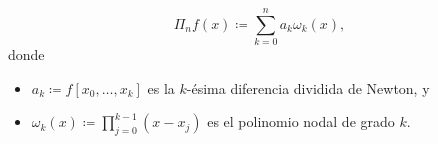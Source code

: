 \begin{frame}



	\begin{definition}
		\begin{equation*}
			\Pi_{n}
			f\left(x\right)\coloneqq
			\sum\limits_{k=0}^{n}
			a_{k}
			\omega_{k}\left(x\right),
		\end{equation*}
		donde
		\begin{itemize}
			\item

			      \begin{math}
				      a_{k}\coloneqq
				      f\left[x_{0},\ldots,x_{k}\right]
			      \end{math}
			      es la $k$-ésima diferencia dividida de Newton, y

			\item

			      \begin{math}
				      \omega_{k}
				      \left(x\right)\coloneqq
				      \prod\limits_{j=0}^{k-1}
				      \left(x-x_{j}\right)
			      \end{math}
			      es el polinomio nodal de grado $k$.
		\end{itemize}
	\end{definition}
\end{frame}


